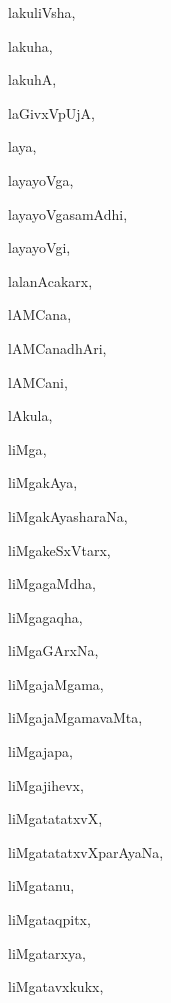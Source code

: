 \begin{multicols}{3}
{\noindent
{lakuliVsha}, \pageref{lakuliVsha}

\noindent
{lakuha}, \pageref{lakuha}

\noindent
{lakuhA}, \pageref{lakuhA}

\noindent
{laGivxVpUjA}, \pageref{laGivxVpUjA}

\noindent
{laya}, \pageref{laya}

\noindent
{layayoVga}, \pageref{layayoVga}

\noindent
{layayoVgasamAdhi}, \pageref{layayoVgasamAdhi}

\noindent
{layayoVgi}, \pageref{layayoVgi}

\noindent
{lalanAcakarx}, \pageref{lalanAcakarx}

\noindent
{lAMCana}, \pageref{lAMCana}

\noindent
{lAMCanadhAri}, \pageref{lAMCanadhAri}

\noindent
{lAMCani}, \pageref{lAMCani}

\noindent
{lAkula}, \pageref{lAkula}

\noindent
{liMga}, \pageref{liMga}

\noindent
{liMgakAya}, \pageref{liMgakAya}

\noindent
{liMgakAyasharaNa}, \pageref{liMgakAyasharaNa}

\noindent
{liMgakeSxVtarx}, \pageref{liMgakeSxVtarx}

\noindent
{liMgagaMdha}, \pageref{liMgagaMdha}

\noindent
{liMgagaqha}, \pageref{liMgagaqha}

\noindent
{liMgaGArxNa}, \pageref{liMgaGArxNa}

\noindent
{liMgajaMgama}, \pageref{liMgajaMgama}

\noindent
{liMgajaMgamavaMta}, \pageref{liMgajaMgamavaMta}

\noindent
{liMgajapa}, \pageref{liMgajapa}

\noindent
{liMgajihevx}, \pageref{liMgajihevx}

\noindent
{liMgatatatxvX}, \pageref{liMgatatatxvX}

\noindent
{liMgatatatxvXparAyaNa}, \pageref{liMgatatatxvXparAyaNa}

\noindent
{liMgatanu}, \pageref{liMgatanu}

\noindent
{liMgataqpitx}, \pageref{liMgataqpitx}

\noindent
{liMgatarxya}, \pageref{liMgatarxya}

\noindent
{liMgatavxkukx}, \pageref{liMgatavxkukx}

}
\end{multicols}
